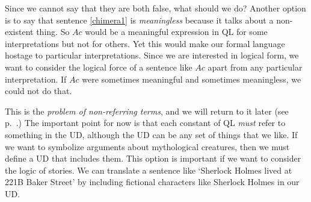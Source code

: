 Since we cannot say that they are both false, what should we do? Another option is to say that sentence \ref{chimera1} is \emph{meaningless} because it talks about a non-existent thing. So $Ac$ would be a meaningful expression in QL for some interpretations but not for others. Yet this would make our formal language hostage to particular interpretations. Since we are interested in logical form, we want to consider the logical force of a sentence like $Ac$ apart from any particular interpretation. If $Ac$ were sometimes meaningful and sometimes meaningless, we could not do that.

This is the \emph{problem of non-referring terms}, and we will return to it later (see p.~\pageref{subsec.defdesc}.) The important point for now is that each constant of QL \emph{must} refer to something in the UD, although the UD can be any set of things that we like. If we want to symbolize arguments about mythological creatures, then we must define a UD that includes them. This option is important if we want to consider the logic of stories. We can translate a sentence like `Sherlock Holmes lived at 221B Baker Street' by including fictional characters like Sherlock Holmes in our UD.



